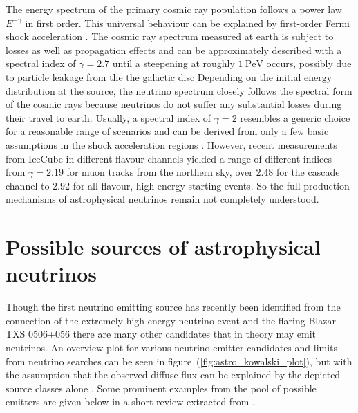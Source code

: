 The energy spectrum of the primary cosmic ray population follows a power law $E^{-\gamma}$ in first order.
This universal behaviour can be explained by first-order Fermi shock acceleration .
The cosmic ray spectrum measured at earth is subject to losses as well as propagation effects and can be approximately described with a spectral index of $\gamma=\num{2.7}$ until a steepening at roughly $\SI{1}{\peta\eV}$ occurs, possibly due to particle leakage from the the galactic disc 
Depending on the initial energy distribution at the source, the neutrino spectrum closely follows the spectral form of the cosmic rays because neutrinos do not suffer any substantial losses during their travel to earth.
Usually, a spectral index of $\gamma=2$ resembles a generic choice for a reasonable range of scenarios and can be derived from only a few basic assumptions in the shock acceleration regions .
However, recent measurements from IceCube in different flavour channels yielded a range of different indices from $\gamma=\num{2.19}$  for muon tracks from the northern sky, over $\num{2.48}$  for the cascade channel to $\num{2.92}$  for all flavour, high energy starting events.
So the full production mechanisms of astrophysical neutrinos remain not completely understood.

\section{Possible sources of astrophysical neutrinos}
Though the first neutrino emitting source has recently been identified from the connection of the extremely-high-energy neutrino event and the flaring Blazar TXS 0506+056  there are many other candidates that in theory may emit neutrinos.
An overview plot for various neutrino emitter candidates and limits from neutrino searches can be seen in figure~(\ref{fig:astro_kowalski_plot}), but with the assumption that the observed diffuse flux can be explained by the depicted source classes alone .
Some prominent examples from the pool of possible emitters are given below in a short review extracted from .

